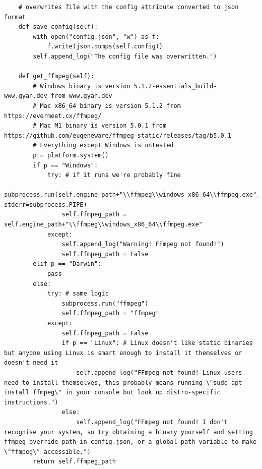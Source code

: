 \documentclass{report}
\begin{document}
\begin{verbatim}
    # overwrites file with the config attribute converted to json format
    def save_config(self):
        with open("config.json", "w") as f:
            f.write(json.dumps(self.config))
        self.append_log("The config file was overwritten.")

    def get_ffmpeg(self):
        # Windows binary is version 5.1.2-essentials_build-www.gyan.dev from www.gyan.dev
        # Mac x86_64 binary is version 5.1.2 from https://evermeet.cx/ffmpeg/
        # Mac M1 binary is version 5.0.1 from https://github.com/eugeneware/ffmpeg-static/releases/tag/b5.0.1
        # Everything except Windows is untested
        p = platform.system()
        if p == "Windows":
            try: # if it runs we're probably fine
                subprocess.run(self.engine_path+"\\ffmpeg\\windows_x86_64\\ffmpeg.exe", stderr=subprocess.PIPE)
                self.ffmpeg_path = self.engine_path+"\\ffmpeg\\windows_x86_64\\ffmpeg.exe"
            except:
                self.append_log("Warning! FFmpeg not found!")
                self.ffmpeg_path = False
        elif p == "Darwin":
            pass
        else:
            try: # same logic
                subprocess.run("ffmpeg")
                self.ffmpeg_path = "ffmpeg"
            except:
                self.ffmpeg_path = False
                if p == "Linux": # Linux doesn't like static binaries but anyone using Linux is smart enough to install it themselves or doesn't need it
                    self.append_log("FFmpeg not found! Linux users need to install themselves, this probably means running \"sudo apt install ffmpeg\" in your console but look up distro-specific instructions.")
                else:
                    self.append_log("FFmpeg not found! I don't recognise your system, so try obtaining a binary yourself and setting ffmpeg_override_path in config.json, or a global path variable to make \"ffmpeg\" accessible.")
        return self.ffmpeg_path


\end{verbatim}
\end{document}
